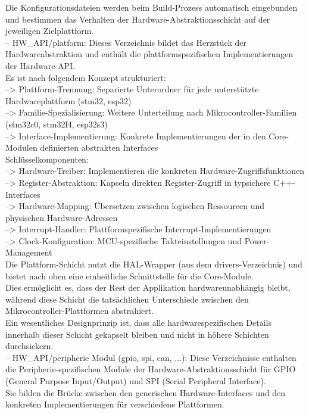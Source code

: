 	Die Konfigurationsdateien werden beim Build-Prozess automatisch eingebunden und bestimmen das Verhalten der Hardware-Abstraktionsschicht auf der jeweiligen Zielplattform.\\
-- HW\_API/platform: Dieses Verzeichnis bildet das Herzstück der Hardwareabstraktion und enthält die plattformspezifischen Implementierungen der Hardware-API. \\
	Es ist nach folgendem Konzept strukturiert:\\
	--> Plattform-Trennung: Separierte Unterordner für jede unterstützte Hardwareplattform (stm32, esp32)\\
	--> Familie-Spezialisierung: Weitere Unterteilung nach Mikrocontroller-Familien (stm32c0, stm32f4, esp32s3)\\
	--> Interface-Implementierung: Konkrete Implementierungen der in den Core-Modulen definierten abstrakten Interfaces\\
	Schlüsselkomponenten:\\
	--> Hardware-Treiber: Implementieren die konkreten Hardware-Zugriffsfunktionen\\
	--> Register-Abstraktion: Kapseln direkten Register-Zugriff in typsichere C++-Interfaces\\
	--> Hardware-Mapping: Übersetzen zwischen logischen Ressourcen und physischen Hardware-Adressen\\
	--> Interrupt-Handler: Plattformspezifische Interrupt-Implementierungen\\
	--> Clock-Konfiguration: MCU-spezifische Takteinstellungen und Power-Management\\
	Die Plattform-Schicht nutzt die HAL-Wrapper (aus dem drivers-Verzeichnis) und bietet nach oben eine einheitliche Schnittstelle für die Core-Module. \\
	Dies ermöglicht es, dass der Rest der Applikation hardwareunabhängig bleibt, während diese Schicht die tatsächlichen Unterschiede zwischen den Mikrocontroller-Plattformen abstrahiert.\\
	Ein wesentliches Designprinzip ist, dass alle hardwarespezifischen Details innerhalb dieser Schicht gekapselt bleiben und nicht in höhere Schichten durchsickern.\\
-- HW\_API/peripherie Modul (gpio, spi, can, ...): Diese Verzeichnisse enthalten die Peripherie-spezifischen Module der Hardware-Abstraktionsschicht für GPIO (General Purpose Input/Output) und SPI (Serial Peripheral Interface). \\
	Sie bilden die Brücke zwischen den generischen Hardware-Interfaces und den konkreten Implementierungen für verschiedene Plattformen.\\

